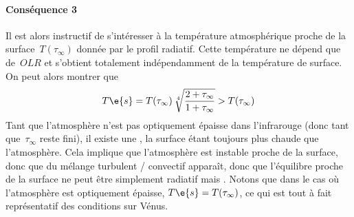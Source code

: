 \sk
\paragraph{Conséquence 3} Il est alors instructif de s'intéresser à la température atmosphérique 
proche de la surface~$T(\tau_\infty)$
donnée par le profil radiatif. Cette température ne dépend que de~$OLR$
et s'obtient totalement indépendamment de la température de surface.
On peut alors montrer que
\[
T\e{s} = T(\tau_\infty) \, \sqrt[4]{\frac{2+\tau_\infty}{1+\tau_\infty}} > T(\tau_\infty)
\]
\noindent Tant que l'atmosphère n'est pas
optiquement épaisse dans l'infrarouge (donc tant que~$\tau_\infty$ reste fini),
il existe une , la surface
étant toujours plus chaude que l'atmosphère. Cela implique que l'atmosphère
est instable proche de la surface, donc que du mélange turbulent / convectif
apparaît, donc que l'équilibre proche de la surface ne peut être simplement
radiatif mais . Notons que dans le cas où l'atmosphère est optiquement épaisse,
$T\e{s} = T(\tau_\infty)$, ce qui est tout à fait représentatif des conditions sur Vénus.


